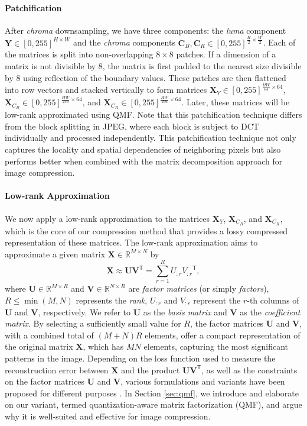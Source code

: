 \paragraph{Patchification}
After \emph{chroma} downsampling, we have three components:  the \emph{luma} component $\bm{Y} \in [0, 255]^{H \times W}$ and the \emph{chroma} components $\bm{C}_B, \bm{C}_R \in [0, 255]^{\frac{H}{2} \times \frac{W}{2}}$. Each of the matrices is split into non-overlapping $8 \times 8$ patches. If a dimension of a matrix is not divisible by 8, the matrix is first padded to the nearest size divisible by 8 using reflection of the boundary values. These patches are then flattened into row vectors and stacked vertically to form matrices $\bm{X}_{Y} \in [0, 255]^{\frac{HW}{64} \times 64}$, $\bm{X}_{C_B} \in [0, 255]^{\frac{HW}{256} \times 64}$, and $\bm{X}_{C_R} \in [0, 255]^{\frac{HW}{256} \times 64}$. Later, these matrices will be low-rank approximated using QMF. Note that this patchification technique differs from the block splitting in JPEG, where each block is subject to DCT individually and processed independently. This patchification technique not only captures the locality and spatial dependencies of neighboring pixels but also performs better when combined with the matrix decomposition approach for image compression.

\paragraph{Low-rank Approximation}
We now apply a low-rank approximation to the matrices $\bm{X}_{Y}$, $\bm{X}_{C_B}$, and $\bm{X}_{C_R}$, which is the core of our compression method that provides a lossy compressed representation of these matrices.  The low-rank approximation \cite{eckart1936approximation} aims to approximate a given matrix $ \bm{X} \in \mathbb{R}^{M \times N} $ by
\begin{equation} \label{eq:lra}
    \bm{X} \approx \bm{U} \bm{V}^\mathsf{T} = \sum_{r=1}^{R} U_{:r} {V_{:r}}^\mathsf{T},
\end{equation}
where $\bm{U} \in \mathbb{R}^{M \times R}$ and $\bm{V} \in \mathbb{R}^{N \times R}$ are \emph{factor matrices} (or simply \emph{factors}), $R \leq \min(M,N)$ represents the \emph{rank}, $U_{:r}$ and $V_{:r}$ represent the $r$-th columns of $\bm{U}$ and $\bm{V}$, respectively. We refer to $\bm{U}$ as the \emph{basis matrix} and $\bm{V}$ as the \emph{coefficient matrix}. By selecting a sufficiently small value for $R$, the factor matrices $\bm{U}$ and $\bm{V}$, with a combined total of $(M+N)R$ elements, offer a compact representation of the original matrix $\bm{X}$, which has $MN$ elements, capturing the most significant patterns in the image. Depending on the loss function used to measure the reconstruction error between $\bm{X}$ and the product $\bm{U} \bm{V}^\mathsf{T}$, as well as the constraints on the factor matrices $\bm{U}$ and $\bm{V}$, various formulations and variants have been proposed for different purposes \cite{lee2000algorithms, ding2008convex, lin2005integer}. In Section \ref{sec:qmf}, we introduce and elaborate on our variant, termed quantization-aware matrix factorization (QMF), and argue why it is well-suited and effective for image compression.


